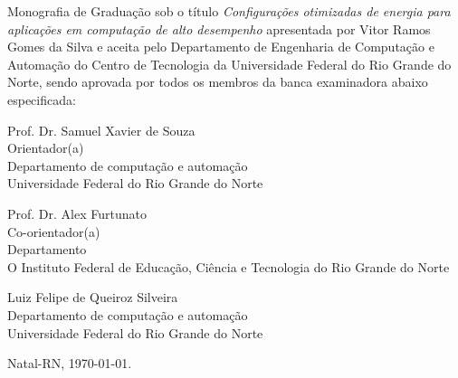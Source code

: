 \begin{folhadeaprovacao}
	\setlength{\ABNTsignthickness}{0.4pt}
	\setlength{\ABNTsignwidth}{10cm}
	
	\noindent 
	Monografia de Graduação sob o título \textit{Configurações otimizadas de energia para aplicações em computação de alto desempenho} apresentada por 
	Vitor Ramos Gomes da Silva e aceita pelo Departamento de Engenharia de Computação e Automação do
	Centro de Tecnologia da Universidade Federal do Rio Grande do Norte,
	sendo aprovada por todos os membros da banca examinadora abaixo especificada:
		
	\assinatura
	{
		Prof. Dr. Samuel Xavier de Souza\\
		{\small Orientador(a)} 															\\ 
		{\footnotesize
			Departamento de computação e automação																	\\
		  	Universidade Federal do Rio Grande do Norte
		}
	}
	
	\assinatura
	{
		Prof. Dr. Alex Furtunato							
		\\
		{\small Co-orientador(a)}							
		\\ 
		{\footnotesize
			Departamento 																	\\
		  	O Instituto Federal de Educação, Ciência e Tecnologia do Rio Grande do Norte
		}
	}
		
	\assinatura
	{
		Luiz Felipe de Queiroz Silveira 						 \\ 
		{\footnotesize
			Departamento de computação e automação 																	 \\
		  	Universidade Federal do Rio Grande do Norte
		}
	}
		
		
	\vfill
	
	\begin{center}
		Natal-RN, \today.
	\end{center}
\end{folhadeaprovacao}